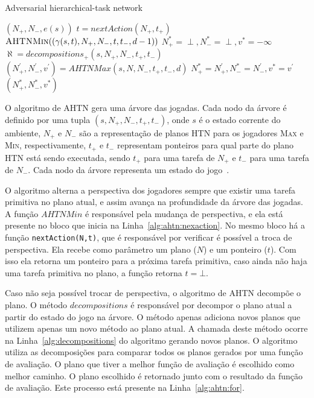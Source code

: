 \begin{algorithm}
	\caption{Adversarial hierarchical-task network}
	\label{alg:ahtn}
	\begin{algorithmic}[1]		
		\label{alg:lin:firstLine}
		\State	\Return $(N_{+}, N_{-}, e(s))$
		\EndIf
		 \label{alg:ahtn:nexaction}
		\State $t = nextAction(N_{+}, t_{+})$ 
		\State \Return $\Call{AHTNMin}{(\gamma(s,t), N_{+}, N_{-}, t, t_{-}, d-1)}$ \label{alg:ahtn:troca}
		\EndIf
		\State $N_{+}^{*} = \perp, N_{-}^{*} = \perp, v^{*} = -\infty$
		\State $\aleph = decompositions_{+}(s, N_{+}, N_{-}, t_{+}, t_{-})$ \label{alg:decompositions}
		 \label{alg:ahtn:for}
		\State $(N^{'}_{+}, N^{'}_{-}, v^{'}) = AHTNMax(s, N, N_{-}, t_{+}, t_{-}, d)$
		\State $N_{+}^{*} = N^{'}_{+}, N_{-}^{*} = N^{'}_{-}, v^{*} = v^{'} $
		\EndIf
		\EndFor		
		\State \Return $(N_{+}^{*}, N_{-}^{*}, v^{*} )$
		\EndFunction
	\end{algorithmic}
\end{algorithm}

O algoritmo de AHTN gera uma árvore das jogadas. Cada nodo da árvore é definido por uma tupla $(s, N_{+}, N_{-}, t_{+}, t_{-})$, onde $s$ é o estado corrente do ambiente, $N_{+}$ e $N_{-}$ são a representação de planos HTN para os jogadores \textsc{Max} e \textsc{Min}, respectivamente, $t_{+}$ e $t_{-}$ representam ponteiros para qual parte do plano HTN está sendo executada, sendo $t_{+}$ para uma tarefa de $N_{+}$ e $t_{-}$ para uma tarefa de $N_{-}$. Cada nodo da árvore representa um estado do jogo~\cite{ontanon2015adversarial}.

O algoritmo alterna a perspectiva dos jogadores sempre que existir uma tarefa primitiva no plano atual, e assim avança na profundidade da árvore das jogadas. A função $AHTNMin$ é responsável pela mudança de perspectiva, e ela está presente no bloco que inicia na Linha~\ref{alg:ahtn:nexaction}. No mesmo bloco há a função \texttt{nextAction(N,t)}, que é responsável por verificar é possível a troca de perspectiva. Ela recebe como parâmetro um plano ($N$) e um ponteiro ($t$). Com isso ela retorna um ponteiro para a próxima tarefa primitiva, caso ainda não haja uma tarefa primitiva no plano, a função retorna $t = \bot$.

Caso não seja possível trocar de perspectiva, o algoritmo de AHTN decompõe o plano. O método $decompositions$ é responsável por decompor o plano atual a partir do estado do jogo na árvore. O método apenas adiciona novos planos que utilizem apenas um novo método ao plano atual. A chamada deste método ocorre na Linha~\ref{alg:decompositions} do algoritmo gerando novos planos.
O algoritmo utiliza as decomposições para comparar todos os planos gerados por uma função de avaliação. O plano que tiver a melhor função de avaliação é escolhido como melhor caminho. O plano escolhido é retornado junto com o resultado da função de avaliação. Este processo está presente na Linha~\ref{alg:ahtn:for}.

